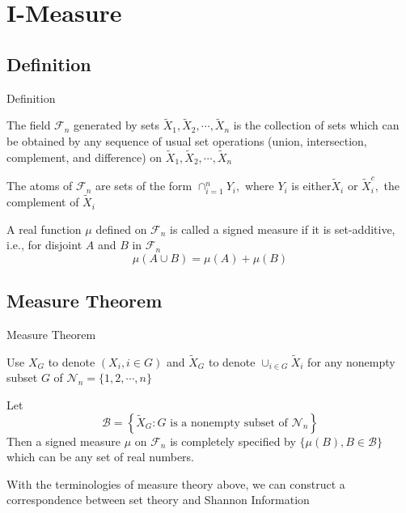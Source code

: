 \section{I-Measure}


\subsection{Definition}
\begin{frame}{Definition}
    \begin{definition}[Field]
        The field $\mathcal{F}_{n}$ generated by sets $\tilde{X}_{1}, \tilde{X}_{2}, \cdots, \tilde{X}_{n}$ is the collection of sets which can be obtained by any sequence of usual set operations (union, intersection, complement, and difference) on $\tilde{X}_{1}, \tilde{X}_{2}, \cdots, \tilde{X}_{n}$
    \end{definition}
    
    
    \begin{definition}[Atom]\label{atom}
    The atoms of $\mathcal{F}_{n}$ are sets of the form $\cap_{i=1}^{n} Y_{i},$ where $Y_{i}$ is either$\tilde{X}_{i}$ or $\tilde{X}_{i}^{c},$ the complement of $\tilde{X}_{i}$\\
    \end{definition}
    
    
    \begin{definition}\label{sm}
    A real function $\mu$ defined on $\mathcal{F}_{n}$ is called a signed measure if it is set-additive, i.e., for disjoint $A$ and $B$ in $\mathcal{F}_{n}$
    \begin{equation}
    \mu(A \cup B)=\mu(A)+\mu(B)
    \end{equation}
    \end{definition}

\end{frame}


\subsection{Measure Theorem}
\begin{frame}{Measure Theorem}
    
    Use $X_{G}$ to denote $\left(X_{i}, i \in G\right)$ and $\tilde{X}_{G}$ to denote $\cup_{i \in G} \tilde{X}_{i}$ for any nonempty subset $G$ of $\mathcal{N}_{n} =\{1,2, \cdots, n\}$\\
 

    \begin{theorem}[Completeness]\label{th1}
    Let
    \begin{equation}
        \mathcal{B}=\left\{\tilde{X}_{G}: G \text { is a nonempty subset of } \mathcal{N}_{n}\right\}
    \end{equation}
    Then a signed measure $\mu$ on $\mathcal{F}_{n}$ is completely specified by $\{\mu(B), B \in \mathcal{B}\}$
    which can be any set of real numbers.
    \end{theorem}
    
    With the terminologies of measure theory above, we can construct a correspondence between set theory and Shannon Information
    
    
\end{frame}

